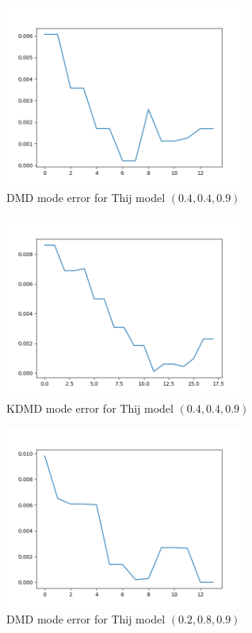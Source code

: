 \begin{figure}
    \includegraphics[width=8cm]{Images/mode_error_dmd_twitter_040409.png}
    \centering
    \caption{DMD mode error for Thij model $(0.4,0.4,0.9)$}
\end{figure}


\begin{figure}
    \includegraphics[width=8cm]{Images/mode_error_kdmd_twitter_040409.png}
    \centering
    \caption{KDMD mode error for Thij model $(0.4,0.4,0.9)$}
\end{figure}


\begin{figure}
    \includegraphics[width=8cm]{Images/mode_error_dmd_twitter_020809.png}
    \centering
    \caption{DMD mode error for Thij model $(0.2,0.8,0.9)$}
\end{figure}


